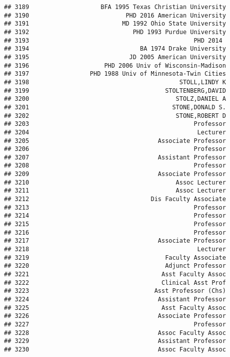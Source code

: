 \documentclass[
]{article}
\begin{document}
\begin{verbatim}
## 3189                    BFA 1995 Texas Christian University
## 3190                           PHD 2016 American University
## 3191                          MD 1992 Ohio State University
## 3192                             PHD 1993 Purdue University
## 3193                                              PHD 2014 
## 3194                               BA 1974 Drake University
## 3195                            JD 2005 American University
## 3196                     PHD 2006 Univ of Wisconsin-Madison
## 3197                 PHD 1988 Univ of Minnesota-Twin Cities
## 3198                                          STOLL,LINDY K
## 3199                                      STOLTENBERG,DAVID
## 3200                                         STOLZ,DANIEL A
## 3201                                        STONE,DONALD S.
## 3202                                         STONE,ROBERT D
## 3203                                              Professor
## 3204                                               Lecturer
## 3205                                    Associate Professor
## 3206                                              Professor
## 3207                                    Assistant Professor
## 3208                                              Professor
## 3209                                    Associate Professor
## 3210                                         Assoc Lecturer
## 3211                                         Assoc Lecturer
## 3212                                  Dis Faculty Associate
## 3213                                              Professor
## 3214                                              Professor
## 3215                                              Professor
## 3216                                              Professor
## 3217                                    Associate Professor
## 3218                                               Lecturer
## 3219                                      Faculty Associate
## 3220                                      Adjunct Professor
## 3221                                     Asst Faculty Assoc
## 3222                                     Clinical Asst Prof
## 3223                                   Asst Professor (Chs)
## 3224                                    Assistant Professor
## 3225                                     Asst Faculty Assoc
## 3226                                    Associate Professor
## 3227                                              Professor
## 3228                                    Assoc Faculty Assoc
## 3229                                    Assistant Professor
## 3230                                    Assoc Faculty Assoc

\end{verbatim}
\end{document}
